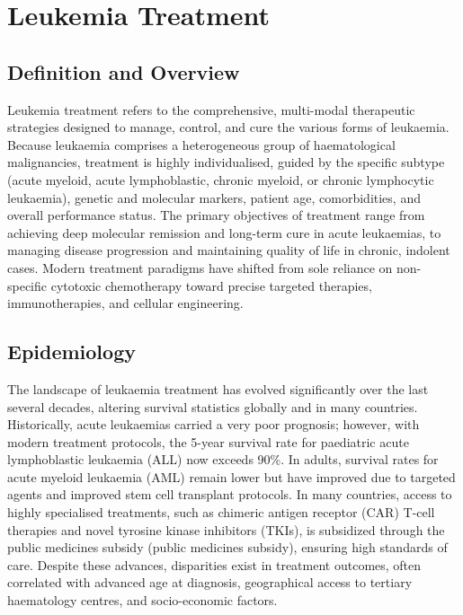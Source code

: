 \chapter{Leukemia Treatment}

\section*{Definition and Overview}
Leukemia treatment refers to the comprehensive, multi-modal therapeutic strategies designed to manage, control, and cure the various forms of leukaemia. Because leukaemia comprises a heterogeneous group of haematological malignancies, treatment is highly individualised, guided by the specific subtype (acute myeloid, acute lymphoblastic, chronic myeloid, or chronic lymphocytic leukaemia), genetic and molecular markers, patient age, comorbidities, and overall performance status. The primary objectives of treatment range from achieving deep molecular remission and long-term cure in acute leukaemias, to managing disease progression and maintaining quality of life in chronic, indolent cases. Modern treatment paradigms have shifted from sole reliance on non-specific cytotoxic chemotherapy toward precise targeted therapies, immunotherapies, and cellular engineering.

\section*{Epidemiology}
The landscape of leukaemia treatment has evolved significantly over the last several decades, altering survival statistics globally and in many countries. Historically, acute leukaemias carried a very poor prognosis; however, with modern treatment protocols, the 5-year survival rate for paediatric acute lymphoblastic leukaemia (ALL) now exceeds 90\%. In adults, survival rates for acute myeloid leukaemia (AML) remain lower but have improved due to targeted agents and improved stem cell transplant protocols. In many countries, access to highly specialised treatments, such as chimeric antigen receptor (CAR) T-cell therapies and novel tyrosine kinase inhibitors (TKIs), is subsidized through the public medicines subsidy (public medicines subsidy), ensuring high standards of care. Despite these advances, disparities exist in treatment outcomes, often correlated with advanced age at diagnosis, geographical access to tertiary haematology centres, and socio-economic factors.

